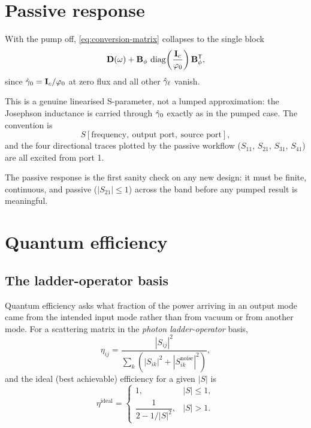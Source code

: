 \section{Passive response}

With the pump off, \eqref{eq:conversion-matrix} collapses to the single block
\begin{equation}
  \mathbf{D}(\omega) + \mathbf{B}_{\phi}\,\operatorname{diag}\!\left(\frac{\mathbf{I}_{c}}{\varphi_{0}}\right)\mathbf{B}_{\phi}^{\mathsf T},
\end{equation}
since $\hat{\gamma}_0 = \mathbf{I}_{c}/\varphi_{0}$ at zero flux and all other $\hat{\gamma}_\ell$ vanish.

\begin{implnote}
This is a genuine linearised S-parameter, not a lumped approximation: the
Josephson inductance is carried through $\hat{\gamma}_0$ exactly as in the pumped case.
The convention is
\begin{equation}
  S[\text{frequency},\ \text{output port},\ \text{source port}],
\end{equation}
and the four directional traces plotted by the passive workflow ($S_{11}$,
$S_{21}$, $S_{31}$, $S_{41}$) are all excited from port 1.
\end{implnote}

The passive response is the first sanity check on any new design: it must be
finite, continuous, and passive ($|S_{21}|\le1$) across the band before any
pumped result is meaningful.

\section{Quantum efficiency}

\subsection{The ladder-operator basis}

Quantum efficiency asks what fraction of the power arriving in an output mode
came from the intended input mode rather than from vacuum or from another mode.
For a scattering matrix in the \emph{photon ladder-operator} basis,
\begin{equation}
  \eta_{ij} = \frac{|S_{ij}|^{2}}
                   {\sum_k \left(|S_{ik}|^{2} + |S^{\mathrm{noise}}_{ik}|^{2}\right)},
  \label{eq:qe}
\end{equation}
and the ideal (best achievable) efficiency for a given $|S|$ is
\begin{equation}
  \eta^{\mathrm{ideal}}
  = \begin{cases}
      1, & |S|\le 1,\\[3pt]
      \dfrac{1}{2 - 1/|S|^{2}}, & |S| > 1 .
    \end{cases}
  \label{eq:qe-ideal}
\end{equation}

